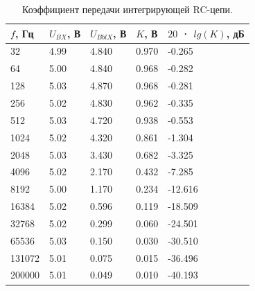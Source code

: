\begin{table}[H]
	\begin{center}
	\caption{Коэффициент передачи интегрирующей RC-цепи.}
	\def\arraystretch{1.5}
		\begin{tabularx}{\textwidth}{|X|X|X|X|X|}
			\hline
			$f$, Гц & $U_{BX}$, В & $U_{BblX}$, В & $K$, В & $20$ · $lg(K)$, дБ\\\hline
			32 & 4.99 & 4.840 & 0.970 & -0.265\\\hline
			64 & 5.00 & 4.840 & 0.968 & -0.282\\\hline
			128 & 5.03 & 4.870 & 0.968 & -0.281\\\hline
			256 & 5.02 & 4.830 & 0.962 & -0.335\\\hline
			512 & 5.03 & 4.720 & 0.938 & -0.553\\\hline
			1024 & 5.02 & 4.320 & 0.861 & -1.304\\\hline
			2048 & 5.03 & 3.430 & 0.682 & -3.325\\\hline
			4096 & 5.02 & 2.170 & 0.432 & -7.285\\\hline
			8192 & 5.00 & 1.170 & 0.234 & -12.616\\\hline
			16384 & 5.02 & 0.596 & 0.119 & -18.509\\\hline
			32768 & 5.02 & 0.299 & 0.060 & -24.501\\\hline
			65536 & 5.03 & 0.150 & 0.030 & -30.510\\\hline
			131072 & 5.01 & 0.075 & 0.015 & -36.496\\\hline
			200000 & 5.01 & 0.049 & 0.010 & -40.193\\\hline			
		\end{tabularx}
		\label{tabular:2}
	\end{center}
\end{table}

